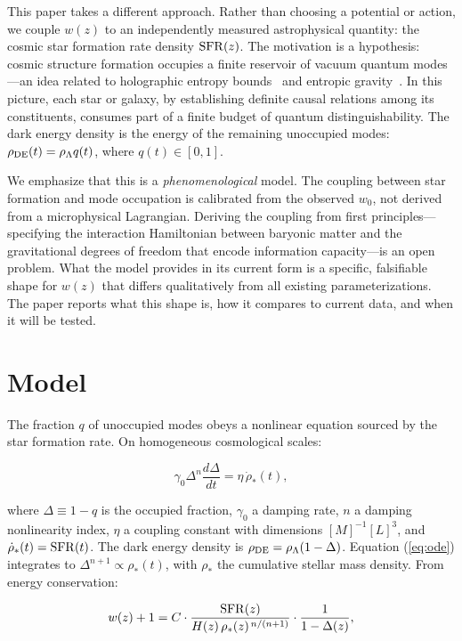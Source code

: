 \documentclass[12pt,a4paper]{article}
\begin{document}
This paper takes a different approach. Rather than choosing a potential or action, we couple $w(z)$ to an independently measured astrophysical quantity: the cosmic star formation rate density ${\rm SFR}(z)$. The motivation is a hypothesis: cosmic structure formation occupies a finite reservoir of vacuum quantum modes---an idea related to holographic entropy bounds~\cite{thooft1993,susskind1995} and entropic gravity~\cite{verlinde2011,jacobson1995}. In this picture, each star or galaxy, by establishing definite causal relations among its constituents, consumes part of a finite budget of quantum distinguishability. The dark energy density is the energy of the remaining unoccupied modes: $\rho_{\rm DE}(t)=\rho_\Lambda q(t)$, where $q(t)\in[0,1]$.

We emphasize that this is a {\it phenomenological} model. The coupling between star formation and mode occupation is calibrated from the observed $w_0$, not derived from a microphysical Lagrangian. Deriving the coupling from first principles---specifying the interaction Hamiltonian between baryonic matter and the gravitational degrees of freedom that encode information capacity---is an open problem. What the model provides in its current form is a specific, falsifiable shape for $w(z)$ that differs qualitatively from all existing parameterizations. The paper reports what this shape is, how it compares to current data, and when it will be tested.

\section*{Model}

The fraction $q$ of unoccupied modes obeys a nonlinear equation sourced by the star formation rate. On homogeneous cosmological scales:

\begin{equation}\label{eq:ode}
\gamma_0\Delta^n\frac{d\Delta}{dt} = \eta\,\dot{\rho}_*(t),
\end{equation}

where $\Delta\equiv1-q$ is the occupied fraction, $\gamma_0$ a damping rate, $n$ a damping nonlinearity index, $\eta$ a coupling constant with dimensions $[M]^{-1}[L]^{3}$, and $\dot{\rho}_*(t)={\rm SFR}(t)$. The dark energy density is $\rho_{\rm DE}=\rho_\Lambda(1-\Delta)$. Equation (\ref{eq:ode}) integrates to $\Delta^{n+1}\propto\rho_*(t)$, with $\rho_*$ the cumulative stellar mass density. From energy conservation:

\begin{equation}\label{eq:shape}
w(z)+1 = C\cdot\frac{{\rm SFR}(z)}{H(z)\,\rho_*(z)^{\,n/(n+1)}}\cdot\frac{1}{1-\Delta(z)},
\end{equation}
\end{document}
